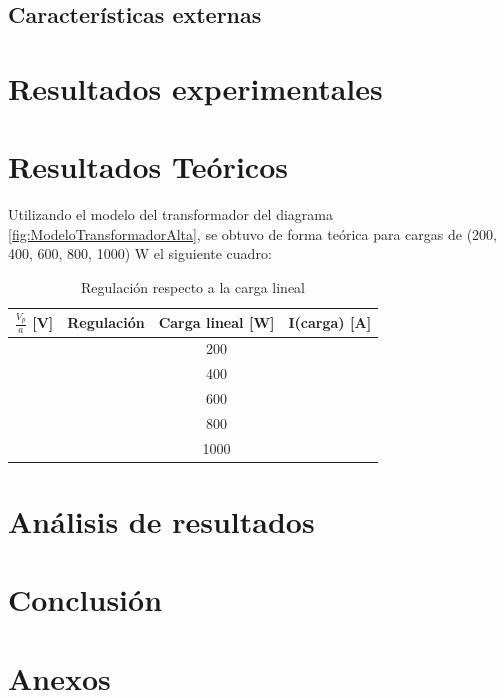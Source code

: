 \documentclass[11pt,letterpaper]{article}     %
\begin{document}
\subsection{Características externas}

\section{Resultados experimentales}

\section{Resultados Teóricos}
Utilizando el modelo del transformador del diagrama \ref{fig:ModeloTransformadorAlta}, se obtuvo de forma teórica para cargas de (200, 400, 600, 800, 1000) W el siguiente cuadro:
\begin{table}[H]
\centering
\caption{Regulación respecto a la carga lineal}
\label{RegcuadroTEORICO}
\begin{tabular}{|c|c|c|c|}
\hline
\textbf{$\frac{V_{p}}{a}$ {[}V{]}} & \textbf{Regulación} & \textbf{Carga lineal {[}W{]}}  & \textbf{I(carga) {[}A{]}} \\ \hline
                                   &                     & 200    &             \\ \hline
                                   &                     & 400    &             \\ \hline
                                   &                     & 600      &              \\ \hline
                                   &                     & 800    &                \\ \hline
                                   &                     & 1000   &                \\ \hline
\end{tabular}
\end{table}
\section{Análisis de resultados}
\section{Conclusión}
\newpage
\section{Anexos}
\end{document}
